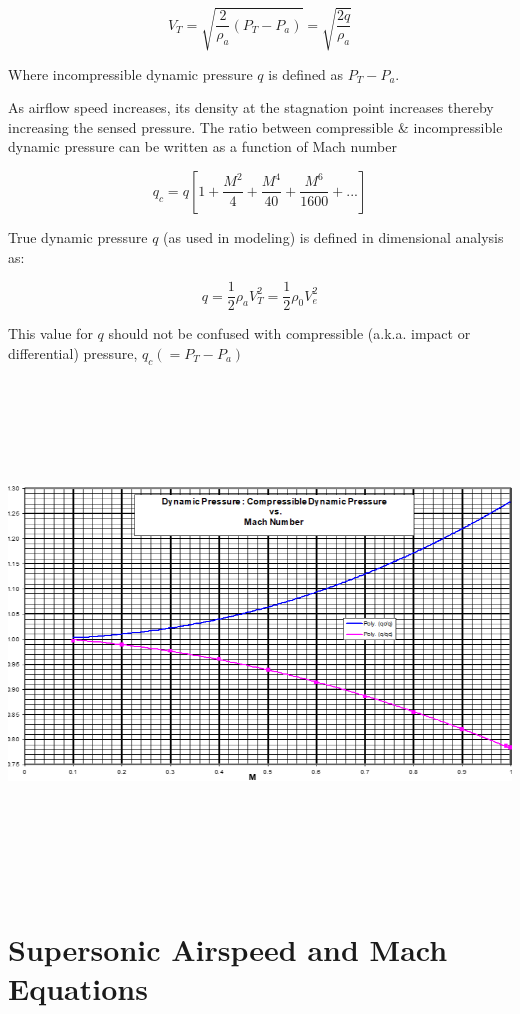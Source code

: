 \documentclass[
]{book}
\begin{document}
\[V_T = \sqrt{\frac{2}{\rho_a}(P_T - P_a)} = \sqrt{\frac{2q}{\rho_a}} \]

Where incompressible dynamic pressure \(q\) is defined as \(P_T-P_a\).

As airflow speed increases, its density at the stagnation point increases thereby increasing the sensed pressure. The ratio between compressible \& incompressible dynamic pressure can be written as a function of Mach number

\[q_c = q \left\lbrack 1 + \frac{M^2}{4} + \frac{M^4}{40} + \frac{M^6}{1600} + ... \right\rbrack \]

True dynamic pressure \(q\) (as used in modeling) is defined in dimensional analysis as:

\[q = \frac{1}{2} \rho_a V_T^2 = \frac{1}{2}\rho_0V_e^2\]

This value for \(q\) should not be confused with compressible (a.k.a. impact or differential) pressure, \(q_c (= P_T - P_a)\)

\includegraphics[width=8.99861in,height=5.29097in]{media/04/image8.png}

\hypertarget{supersonic-airspeed-and-mach-equations}{%
\section{Supersonic Airspeed and Mach Equations}\label{supersonic-airspeed-and-mach-equations}}
\end{document}

